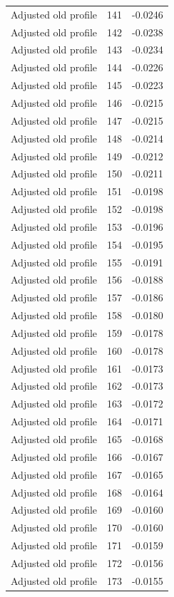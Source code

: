 \begin{table}[htbp]
\begin{tabular}{lll}
Adjusted old profile & 141 & -0.0246 \\
Adjusted old profile & 142 & -0.0238 \\
Adjusted old profile & 143 & -0.0234 \\
Adjusted old profile & 144 & -0.0226 \\
Adjusted old profile & 145 & -0.0223 \\
Adjusted old profile & 146 & -0.0215 \\
Adjusted old profile & 147 & -0.0215 \\
Adjusted old profile & 148 & -0.0214 \\
Adjusted old profile & 149 & -0.0212 \\
Adjusted old profile & 150 & -0.0211 \\
Adjusted old profile & 151 & -0.0198 \\
Adjusted old profile & 152 & -0.0198 \\
Adjusted old profile & 153 & -0.0196 \\
Adjusted old profile & 154 & -0.0195 \\
Adjusted old profile & 155 & -0.0191 \\
Adjusted old profile & 156 & -0.0188 \\
Adjusted old profile & 157 & -0.0186 \\
Adjusted old profile & 158 & -0.0180 \\
Adjusted old profile & 159 & -0.0178 \\
Adjusted old profile & 160 & -0.0178 \\
Adjusted old profile & 161 & -0.0173 \\
Adjusted old profile & 162 & -0.0173 \\
Adjusted old profile & 163 & -0.0172 \\
Adjusted old profile & 164 & -0.0171 \\
Adjusted old profile & 165 & -0.0168 \\
Adjusted old profile & 166 & -0.0167 \\
Adjusted old profile & 167 & -0.0165 \\
Adjusted old profile & 168 & -0.0164 \\
Adjusted old profile & 169 & -0.0160 \\
Adjusted old profile & 170 & -0.0160 \\
Adjusted old profile & 171 & -0.0159 \\
Adjusted old profile & 172 & -0.0156 \\
Adjusted old profile & 173 & -0.0155 \\

\end{tabular}
\end{table}

